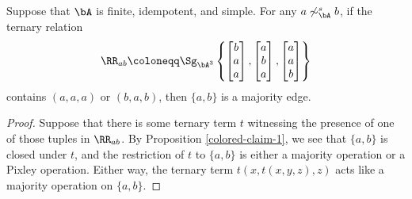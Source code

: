 \begin{prop}\label{colored-claim-2} Suppose that $\bA$ is finite, idempotent, and simple. For any $a \not\sim^s_\bA b$, if the ternary relation
\[
\RR_{ab} \coloneqq \Sg_{\bA^3}\left\{\begin{bmatrix} b\\ a\\ a\end{bmatrix}, \begin{bmatrix} a\\ b\\ a\end{bmatrix}, \begin{bmatrix} a\\ a\\ b\end{bmatrix}\right\}
\]
contains $(a,a,a)$ or $(b,a,b)$, then $\{a,b\}$ is a majority edge.
\end{prop}
\begin{proof} Suppose that there is some ternary term $t$ witnessing the presence of one of those tuples in $\RR_{ab}$. By Proposition \ref{colored-claim-1}, we see that $\{a,b\}$ is closed under $t$, and the restriction of $t$ to $\{a,b\}$ is either a majority operation or a Pixley operation. Either way, the ternary term $t(x,t(x,y,z),z)$ acts like a majority operation on $\{a,b\}$.
\end{proof}

